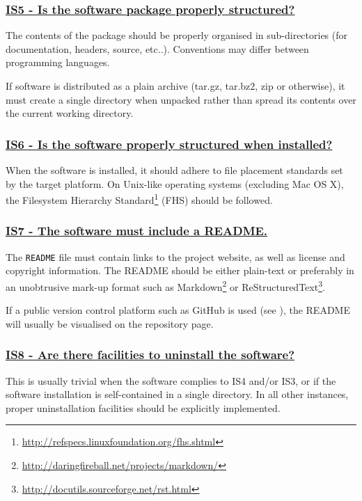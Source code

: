 \documentclass[a4paper,11pt]{article}
\newcommand{\criterion}[2]{\subsubsection*{\underline{#1 - #2}}\label{id:#1}}
\newcommand\CheckTable{%
  \begin{tabular}{ccccc}
    No & Minimal & Adequate & Good & Perfect \\
    0 & 1 & 2 & 3 & 4 \\
    \hline
    $\square$ & $\square$ & $\square$ & $\square$ & $\square$ \\
  \end{tabular}%
}
\newcommand{\refcrit}[1]{%
 \framebox[1.1\width]{\hyperref[id:#1]{#1}}
}
\begin{document}

\newcommand{\isFiveID}{IS5}
\newcommand{\isFiveText}{Is the software package properly structured?}
\criterion{\isFiveID}{\isFiveText}

The contents of the package should be properly organised in sub-directories
(for documentation, headers, source, etc..). Conventions may differ between
programming languages.

If software is distributed as a plain archive (tar.gz, tar.bz2, zip or otherwise),
it must create a single directory when unpacked rather than spread its contents
over the current working directory.


\newcommand{\isSixID}{IS6}
\newcommand{\isSixText}{Is the software properly structured when installed?}
\criterion{\isSixID}{\isSixText}

When the software is installed, it should adhere to file placement standards set
by the target platform. On Unix-like operating systems (excluding Mac OS X), the Filesystem
Hierarchy Standard\footnote{\url{http://refspecs.linuxfoundation.org/fhs.shtml}} (FHS) should be followed.


\newcommand{\isSevenID}{IS7}
\newcommand{\isSevenText}{The software must include a README.}
\criterion{\isSevenID}{\isSevenText}

The \texttt{README} file must contain links to the project website, as well as
license and copyright information. The README should be either plain-text or
preferably in an unobtrusive mark-up format such as
Markdown\footnote{\url{http://daringfireball.net/projects/markdown/}} or
ReStructuredText\footnote{\url{http://docutils.sourceforge.net/rst.html}}.

If a public version control platform such as GitHub is used (see \refcrit{AC2}), the
README will usually be visualised on the repository page.


\newcommand{\isEightID}{IS8}
\newcommand{\isEightText}{Are there facilities to uninstall the software?}
\criterion{\isEightID}{\isEightText}

This is usually trivial when the software complies to IS4 and/or IS3, or if the
software installation is self-contained in a single directory. In all other
instances, proper uninstallation facilities should be explicitly implemented.

\end{document}

